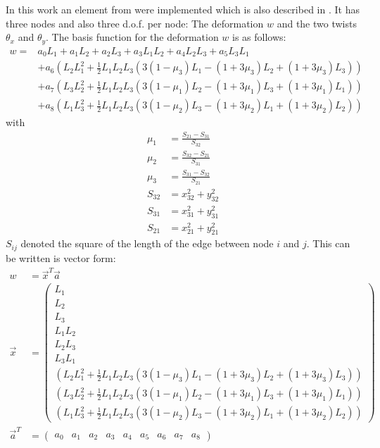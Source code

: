   In this work an element from \cite{specht1988modified} were implemented which is also described in \cite{steinke2005finite}. It has three nodes and also three d.o.f. per node: The deformation $w$ and the two twists $\theta_x$ and $\theta_y$. The basis function for the deformation $w$ is as follows:
  \begin{align}
  w = &a_0 L_1 + a_1 L_2 + a_2 L_3 + a_3 L_1L_2 + a_4 L_2L_3 + a_5 L_3L_1 \nonumber\\
    & + a_6\left(L_2L_1^2 + \frac{1}{2}L_1L_2L_3 \left(3(1-\mu_3)L_1 - (1+3\mu_3)L_2 + (1+3\mu_3)L_3\right)\right) \nonumber\\
    & + a_7\left(L_3L_2^2 + \frac{1}{2}L_1L_2L_3 \left(3(1-\mu_1)L_2 - (1+3\mu_1)L_3 + (1+3\mu_1)L_1\right)\right) \nonumber\\
    & + a_8\left(L_1L_3^2 + \frac{1}{2}L_1L_2L_3 \left(3(1-\mu_2)L_3 - (1+3\mu_2)L_1 + (1+3\mu_2)L_2\right)\right)
  \end{align}
  with
  \begin{align}
  \mu_1 &= \frac{S_{21} - S_{31}}{S_{32}} \nonumber\\
  \mu_2 &= \frac{S_{32} - S_{21}}{S_{31}} \nonumber\\
  \mu_3 &= \frac{S_{31} - S_{32}}{S_{21}} \\
  S_{32} &= x_{32}^2 + y_{32}^2 \nonumber\\
  S_{31} &= x_{31}^2 + y_{31}^2 \nonumber\\
  S_{21} &= x_{21}^2 + y_{21}^2
  \end{align}
  $S_{ij}$ denoted the square of the length of the edge between node $i$ and $j$.
  This can be written is vector form:
  \begin{align}\label{eq:platet3w=x*a}
  w &= \vec{x}^T \vec{a} \nonumber\\
  \vec{x} &= \begin{pmatrix}
  L_1 \\ L_2 \\ L_3 \\ L_1L_2 \\ L_2L_3 \\ L_3L_1\\
  \left(L_2L_1^2+\frac{1}{2}L_1L_2L_3\left(3(1-\mu_3)L_1-(1+3\mu_3)L_2+(1+3\mu_3)L_3\right)\right)\\
  \left(L_3L_2^2+\frac{1}{2}L_1L_2L_3\left(3(1-\mu_1)L_2-(1+3\mu_1)L_3+(1+3\mu_1)L_1\right)\right)\\
  \left(L_1L_3^2+\frac{1}{2}L_1L_2L_3\left(3(1-\mu_2)L_3-(1+3\mu_2)L_1+(1+3\mu_2)L_2\right)\right)
  \end{pmatrix} \nonumber\\
  \vec{a}^T &= \begin{pmatrix}
  a_0 & a_1 & a_2 & a_3 & a_4 & a_5 & a_6 & a_7 & a_8
  \end{pmatrix}
  \end{align}
  
